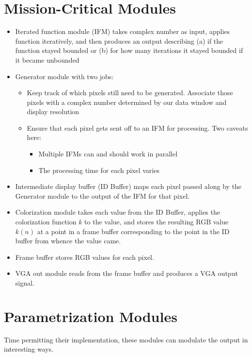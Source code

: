 \documentclass{article}
\begin{document}
\section{Mission-Critical Modules}

\begin{itemize}
\item Iterated function module (IFM) takes complex number as input,
  applies function iteratively, and then produces an output describing
  (a) if the function stayed bounded or (b) for how many iterations it
  stayed bounded if it became unbounded
\item Generator module with two jobs:
  \begin{itemize}
  \item Keep track of which pixels still need to be
    generated. Associate those pixels with a complex number determined
    by our data window and display resolution
  \item Ensure that each pixel gets sent off to an IFM for
    processing. Two caveats here:
    \begin{itemize}
    \item Multiple IFMs can and should work in parallel
    \item The processing time for each pixel varies
    \end{itemize}
  \end{itemize}
\item Intermediate display buffer (ID Buffer) maps each pixel passed
  along by the Generator module to the output of the IFM for that
  pixel.
\item Colorization module takes each value from the ID Buffer, applies
  the colorization function $k$ to the value, and stores the resulting
  RGB value $k(n)$ at a point in a frame buffer corresponding to the
  point in the ID buffer from whence the value came.
\item Frame buffer stores RGB values for each pixel.
\item VGA out module reads from the frame buffer and produces a VGA
  output signal.
\end{itemize}

\section{Parametrization Modules}
Time permitting their implementation, these modules can modulate the
output in interesting ways.
\end{document}
